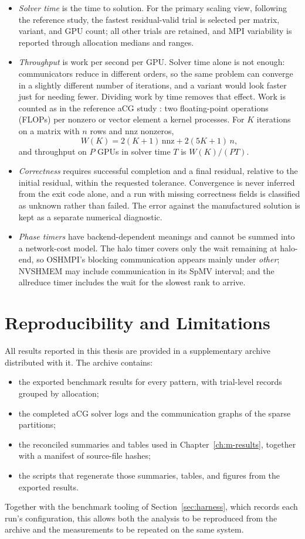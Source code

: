\begin{itemize}
    \item \emph{Solver time} is the time to solution. For the primary scaling view, following the reference study, the fastest residual-valid trial is selected per matrix, variant, and GPU count; all other trials are retained, and MPI variability is reported through allocation medians and ranges.
    \item \emph{Throughput} is work per second per GPU. Solver time alone is not enough: communicators reduce in different orders, so the same problem can converge in a slightly different number of iterations, and a variant would look faster just for needing fewer. Dividing work by time removes that effect. Work is counted as in the reference aCG study \cite{trotter_cpu-_2025}: two floating-point operations (FLOPs) per nonzero or vector element a kernel processes. For $K$ iterations on a matrix with $n$ rows and $\mathrm{nnz}$ nonzeros,
    \[
    W(K)=2(K+1)\,\mathrm{nnz}+2(5K+1)\,n,
    \]
    and throughput on $P$ GPUs in solver time $T$ is $W(K)/(PT)$.
    \item \emph{Correctness} requires successful completion and a final residual, relative to the initial residual, within the requested tolerance. Convergence is never inferred from the exit code alone, and a run with missing correctness fields is classified as unknown rather than failed. The error against the manufactured solution is kept as a separate numerical diagnostic.
    \item \emph{Phase timers} have backend-dependent meanings and cannot be summed into a network-cost model. The halo timer covers only the wait remaining at halo-end, so OSHMPI's blocking communication appears mainly under \emph{other}; NVSHMEM may include communication in its SpMV interval; and the allreduce timer includes the wait for the slowest rank to arrive.
\end{itemize}

\section{Reproducibility and Limitations}\label{sec:reproducibility}

All results reported in this thesis are provided in a supplementary archive distributed with it. The archive contains:
\begin{itemize}
    \item the exported benchmark results for every pattern, with trial-level records grouped by allocation;
    \item the completed aCG solver logs and the communication graphs of the sparse partitions;
    \item the reconciled summaries and tables used in Chapter~\ref{ch:m-results}, together with a manifest of source-file hashes;
    \item the scripts that regenerate those summaries, tables, and figures from the exported results.
\end{itemize}
Together with the benchmark tooling of Section~\ref{sec:harness}, which records each run's configuration, this allows both the analysis to be reproduced from the archive and the measurements to be repeated on the same system.

